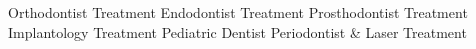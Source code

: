 Orthodontist Treatment Endodontist Treatment Prosthodontist Treatment Implantology Treatment Pediatric Dentist Periodontist & Laser Treatment